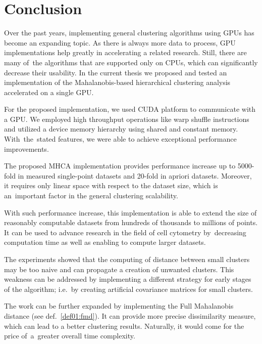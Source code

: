 \chapter*{Conclusion}

Over the past years, implementing general clustering algorithms using GPUs has become an expanding topic. As there is always more data to process, GPU implementations help greatly in accelerating a related research.  Still, there are many of~the algorithms that are supported only on CPUs, which can significantly decrease their usability. In the current thesis we proposed and tested an implementation of the Mahalanobis-based hierarchical clustering analysis accelerated on a single GPU. 

For the proposed implementation, we used CUDA platform to communicate with a GPU. We employed high throughput operations like warp shuffle instructions and utilized a device memory hierarchy using shared and constant memory. With~the~stated features, we were able to achieve exceptional performance improvements.

The proposed MHCA implementation provides performance increase up to 5000-fold in measured single-point datasets and 20-fold in apriori datasets. Moreover, it requires only linear space with respect to the dataset size, which is an~important factor in the general clustering scalability.

With such performance increase, this implementation is able to extend the size of reasonably computable datasets from hundreds of thousands to millions of points. It can be used to advance research in the field of cell cytometry by~decreasing computation time as well as enabling to compute larger datasets.

The experiments showed that the computing of distance between small clusters may be too naive and can propagate a creation of unwanted clusters. This weakness can be addressed by implementing a different strategy for early stages of the algorithm; i.e.~by creating artificial covariance matrices for small clusters.

The work can be further expanded by implementing the Full Mahalanobis distance (see def.~\ref{def01:fmd}). It can provide more precise dissimilarity measure, which can lead to a better clustering results. Naturally, it would come for the price of~a~greater overall time complexity. 